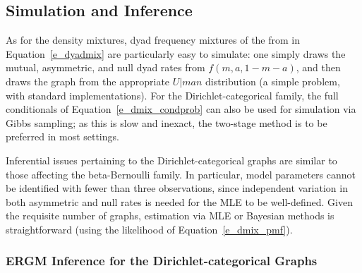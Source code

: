 \documentclass[11pt]{article}
\begin{document}
\subsection{Simulation and Inference}

As for the density mixtures, dyad frequency mixtures of the from in Equation~\ref{e_dyadmix} are particularly easy to simulate: one simply draws the mutual, asymmetric, and null dyad rates from $f(m,a,1-m-a)$, and then draws the graph from the appropriate $U|man$ distribution (a simple problem, with standard implementations).  For the Dirichlet-categorical family, the full conditionals of Equation~\ref{e_dmix_condprob} can also be used for simulation via Gibbs sampling; as this is slow and inexact, the two-stage method is to be preferred in most settings.

Inferential issues pertaining to the Dirichlet-categorical graphs are similar to those affecting the beta-Bernoulli family.  In particular, model parameters cannot be identified with fewer than three observations, since independent variation in both asymmetric and null rates is needed for the MLE to be well-defined.  Given the requisite number of graphs, estimation via MLE or Bayesian methods is straightforward (using the likelihood of Equation~\ref{e_dmix_pmf}).

\subsubsection{ERGM Inference for the Dirichlet-categorical Graphs} \label{sec_ergm_dmix}
\end{document}
